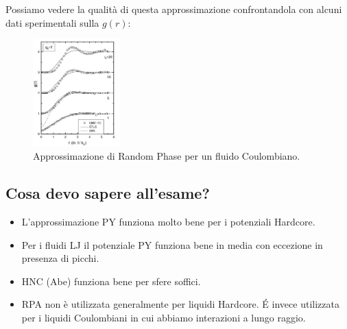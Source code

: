 Possiamo vedere la qualità di questa approssimazione confrontandola con alcuni dati sperimentali sulla  $g(r)$:
\begin{figure}[ht]
	\centering
	\includegraphics[width=0.3\textwidth]{figures/RP-coulomb.png}
	\caption{Approssimazione di Random Phase per un fluido Coulombiano.}
	\label{fig:figures-RP-coulomb-png}
\end{figure}
\subsection{Cosa devo sapere all'esame?}
\label{subsec:Cosa devo sapere all'esame?}
\begin{itemize}
	\item L'approssimazione PY funziona molto bene per i potenziali Hardcore.
	\item Per i fluidi LJ il potenziale PY funziona bene in media con eccezione
		in presenza di picchi.
	\item HNC (Abe) funziona bene per sfere soffici.
	\item RPA non è utilizzata generalmente per liquidi Hardcore. É invece utilizzata 
		per i liquidi Coulombiani in cui abbiamo interazioni a lungo raggio.
\end{itemize}
